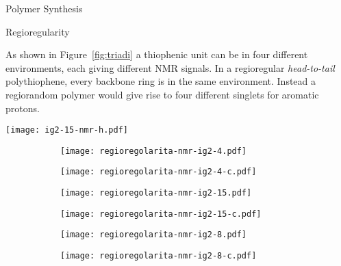 \begin{section}{Polymer Synthesis}
\begin{subsection}{Regioregularity}
\label{sec:regioregolarita}

As shown in Figure~\ref{fig:triadi} a thio\-phenic unit can be in four different environments, each giving different \gls{NMR} signals. In a regioregular \textit{head-to-tail} poly\-thio\-phene, every backbone ring is in the same environment. Instead a regiorandom polymer would give rise to four different singlets for aromatic protons.

\begin{SCfigure}[][tbp]%
\texttt{[image: ig2-15-nmr-h.pdf]}
\caption[{\HNMR} of polymer \cmpd+{ig2-15}.]{{\HNMR} (\SI{600}{\MHz}) of polymer \cmpd+{ig2-15} in \gls{TCE}-d2.}
\label{fig:ig2-15-nmr-h}
\end{SCfigure}

\begin{figure}[tbp]%
\parbox[b]{0.47\linewidth}{
\begin{subfigure}[b]{0.47\textwidth}
\parbox[b]{0\linewidth}{\subcaption{}\label{fig:regioregolarita-nmr-ig2-4}}
\texttt{[image: regioregolarita-nmr-ig2-4.pdf]}
\end{subfigure}}
\qquad
\parbox[b]{0.47\linewidth}{
\begin{subfigure}[b]{0.47\textwidth}
\parbox[b]{0\linewidth}{\subcaption{}\label{fig:regioregolarita-nmr-ig2-4-c}}
\texttt{[image: regioregolarita-nmr-ig2-4-c.pdf]}
\end{subfigure}
}

\parbox[b]{0.47\linewidth}{
\begin{subfigure}[b]{0.47\textwidth}
\parbox[b]{0\linewidth}{\subcaption{}\label{fig:regioregolarita-nmr-ig2-15}}
\texttt{[image: regioregolarita-nmr-ig2-15.pdf]}
\end{subfigure}}
\qquad
\parbox[b]{0.47\linewidth}{
\begin{subfigure}[b]{0.47\textwidth}
\parbox[b]{0\linewidth}{\subcaption{}\label{fig:regioregolarita-nmr-ig2-15-c}}
\texttt{[image: regioregolarita-nmr-ig2-15-c.pdf]}
\end{subfigure}
}

\parbox[b]{0.47\linewidth}{
\begin{subfigure}[b]{0.47\textwidth}
\parbox[b]{0\linewidth}{\subcaption{\vspace{15pt}}\label{fig:regioregolarita-nmr-ig2-8}}
\texttt{[image: regioregolarita-nmr-ig2-8.pdf]}
\end{subfigure}}
\qquad
\parbox[b]{0.47\linewidth}{
\begin{subfigure}[b]{0.47\textwidth}
\parbox[b]{0\linewidth}{\subcaption{\vspace{15pt}}\label{fig:regioregolarita-nmr-ig2-8-c}}
\texttt{[image: regioregolarita-nmr-ig2-8-c.pdf]}
\end{subfigure}
}


\end{figure}
\end{subsection}
\end{section}
